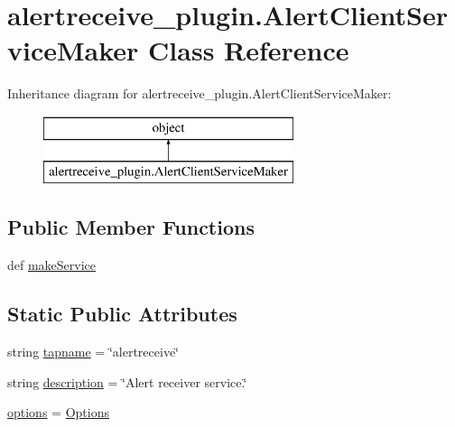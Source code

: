 \hypertarget{classalertreceive__plugin_1_1_alert_client_service_maker}{\section{alertreceive\-\_\-plugin.\-Alert\-Client\-Service\-Maker Class Reference}
\label{classalertreceive__plugin_1_1_alert_client_service_maker}
}
Inheritance diagram for alertreceive\-\_\-plugin.\-Alert\-Client\-Service\-Maker\-:\begin{figure}[H]
\begin{center}
\leavevmode
\includegraphics[height=2.000000cm]{classalertreceive__plugin_1_1_alert_client_service_maker}
\end{center}
\end{figure}
\subsection*{Public Member Functions}
\begin{DoxyCompactItemize}
\item 
def \hyperlink{classalertreceive__plugin_1_1_alert_client_service_maker_ac557b7942ac384b03f36f130cd832224}{make\-Service}
\end{DoxyCompactItemize}
\subsection*{Static Public Attributes}
\begin{DoxyCompactItemize}
\item 
string \hyperlink{classalertreceive__plugin_1_1_alert_client_service_maker_aa06203843a8e49cf4a4e3ce3bb0e9674}{tapname} = \char`\"{}alertreceive\char`\"{}
\item 
string \hyperlink{classalertreceive__plugin_1_1_alert_client_service_maker_a1e9e4e09410f1652b9e3e64713a9ed23}{description} = \char`\"{}Alert receiver service.\char`\"{}
\item 
\hyperlink{classalertreceive__plugin_1_1_alert_client_service_maker_a602e325f18585e9ee7d01055df4c4977}{options} = \hyperlink{classalertreceive__plugin_1_1_options}{Options}
\end{DoxyCompactItemize}


